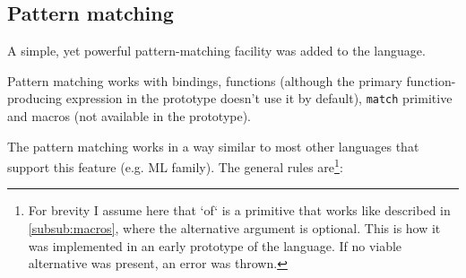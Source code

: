 \subsection{Pattern matching}\label{sec:pat}
A simple, yet powerful pattern-matching facility was added to the language.

Pattern matching works with bindings, functions (although the primary
function-producing expression in the prototype doesn't use it by default),
\texttt{match} primitive and macros (not available in the prototype).

The pattern matching works in a way similar to most other languages that support
this feature (e.g. ML family). The general rules are\footnote{For brevity I
  assume here that `of` is a primitive that works like described in
  \ref{subsub:macros}, where the alternative argument is optional. This is how
  it was implemented in an early prototype of the language. If no viable
  alternative was present, an error was thrown.}:
